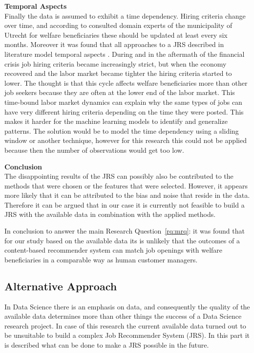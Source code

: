 \noindent
\textbf{Temporal Aspects} \\
Finally the data is assumed to exhibit a time dependency.
Hiring criteria change over time, and according to consulted domain experts of the municipality of Utrecht for welfare beneficiaries these should be updated at least every six months. 
Moreover it was found that all approaches to a JRS described in literature model temporal aspects  \cite{kenthapadi2017personalized, T.Al-Otaibi2012ASystems, Zheng2012JobSurvey, hong2013job}.
During and in the aftermath of the financial crisis job hiring criteria became increasingly strict, but when the economy recovered and the labor market became tighter the hiring criteria started to lower. 
The thought is that this cycle affects welfare beneficiaries more than other job seekers because they are often at the lower end of the labor market.
This time-bound labor market dynamics can explain why the same types of jobs can have very different hiring criteria depending on the time they were posted.
This makes it harder for the machine learning models to identify and generalize patterns.
The solution would be to model the time dependency using a sliding window or another technique, however for this research this could not be applied because then the number of observations would get too low.  

\noindent
\textbf{Conclusion}\\
The disappointing results of the JRS can possibly also be contributed to the methods that were chosen or the features that were selected. 
However, it appears more likely that it can be attributed to the bias and noise that reside in the data.
Therefore it can be argued that in our case it is currently not feasible to build a JRS with the available data in combination with the applied methods. 

In conclusion to answer the main Research Question~\ref{rq:mrq}: it was found that for our study based on the available data its is unlikely that the outcomes of a content-based recommender system can match job openings with welfare beneficiaries in a comparable way as human customer managers. 

\subsection{Alternative Approach}
\label{ssec:learnings}

In Data Science there is an emphasis on data, and consequently the quality of the available data determines more than other things the success of a Data Science research project.
In case of this research the current available data turned out to be unsuitable to build a complex Job Recommender System (JRS). 
In this part it is described what can be done to make a JRS possible in the future.

